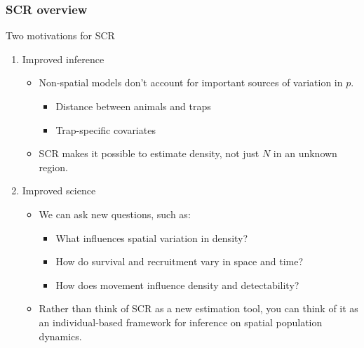 \documentclass[color=usenames,dvipsnames]{beamer}\usepackage[]{graphicx}\usepackage[]{color}
\begin{document}
\begin{frame}
  \frametitle{SCR overview}
  {\centering \large Two motivations for SCR \\}
  \vfill
  \begin{enumerate}
    \item Improved inference
    \begin{itemize}
      \item<1-> Non-spatial models don't account for important sources
        of variation in $p$. %
        \begin{itemize}
          \item<1-> Distance between animals and traps
          \item<1-> Trap-specific covariates
        \end{itemize}
      \item<2-> SCR makes it possible to estimate \alert{density}, not
        just $N$ in an unknown region. 
    \end{itemize}
    \pause
    \vfill
  \item<3-> Improved science
  \begin{itemize}
    \item<3-> We can ask new questions, such as:
      \begin{itemize}
        \item<3-> What influences spatial variation in density?
        \item<4-> How do survival and recruitment vary in space and time?
        \item<5-> How does movement influence density and detectability?
      \end{itemize}
    \item<6-> Rather than think of SCR as a new estimation tool, you
      can think of it as an individual-based framework for inference on
      spatial population dynamics.
    \end{itemize}
  \end{enumerate}
\end{frame}
\end{document}
